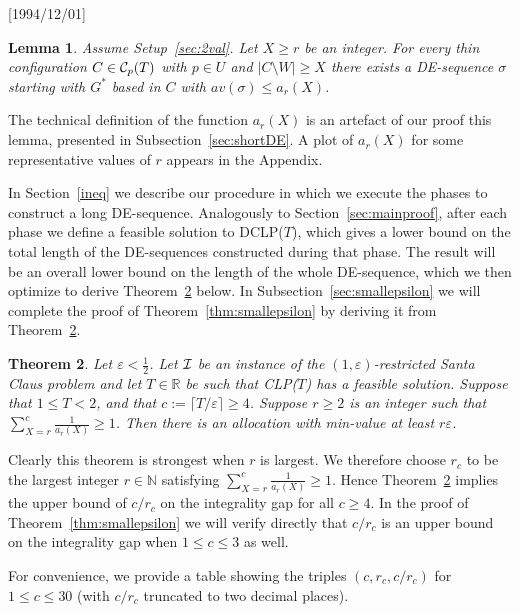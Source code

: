 \NeedsTeXFormat{LaTeX2e}[1994/12/01]\documentclass[letterpaper, 11pt]{article}
\newtheorem{thm}{Theorem}[section]
\newtheorem{lem}[thm]{Lemma}
\theoremstyle{definition}
\theoremstyle{remark}
\numberwithin{equation}{section}
\begin{document}
\begin{lem}\label{lem:basedinC}
Assume Setup~\ref{sec:2val}. 
Let $X\geq r$ be an integer. For every thin configuration $C\in {\cal
  C}_p(T)$ with 
  $p\in U$ and $|C\setminus W| \geq X$
there exists a DE-sequence $\sigma$ starting with $G^*$ based in $C$
with  $av(\sigma)\leq a_r(X)$.
\end{lem}
 The technical definition of the function $a_r(X)$ is an artefact of our proof this lemma, presented in Subsection~\ref{sec:shortDE}. A plot of $a_r(X)$ for some representative values of $r$ appears in the Appendix.

  In Section~\ref{ineq} we describe our procedure in which we execute the phases to construct a long DE-sequence. Analogously to Section~\ref{sec:mainproof}, after each phase we define a feasible solution to DCLP($T$), which gives a lower bound on the total length of the DE-sequences constructed during that phase. 
 The result will be an overall lower bound on the length of the whole DE-sequence, which we then optimize to derive 
Theorem~\ref{thm:2val} below. 
In Subsection~\ref{sec:smallepsilon} we will complete the proof of Theorem~\ref{thm:smallepsilon} by deriving it from Theorem~\ref{thm:2val}.

\begin{thm}\label{thm:2val} Let $\varepsilon < \frac{1}{2}$. Let
  ${\cal I}$ be an instance of
  the $(1,\varepsilon)$-restricted Santa Claus problem
and let $T\in \mathbb{R}$ be such that CLP($T$) has a feasible
solution. Suppose that $1\leq T<  2$, and that
$c :=\lceil T/\varepsilon\rceil\geq 4$. 
Suppose $r\geq 2$ is an integer such that $\sum_{X=r}^c
\frac{1}{a_r(X)} \geq 1$. 
Then there is an allocation with
min-value at least $r\varepsilon$.
\end{thm}


Clearly this theorem is strongest when $r$ is
  largest. We therefore choose $r_c$ to be the largest integer $r \in
\mathbb{N}$ 
satisfying $\sum_{X=r}^c \frac{1}{a_r(X)} \geq
1$. Hence Theorem~\ref{thm:2val} implies the upper bound of $c/r_c$ on the integrality gap for all $c\geq 4$.
In the proof of Theorem~\ref{thm:smallepsilon} we will verify directly that
$c/r_c$ is an upper bound on the integrality gap when $1\leq c\leq 3$ as well.

For convenience, we provide a table showing the triples $(c,r_c,c/r_c)$ for $1\leq c\leq30$ (with $c/r_c$ truncated to two decimal places).
\end{document}
